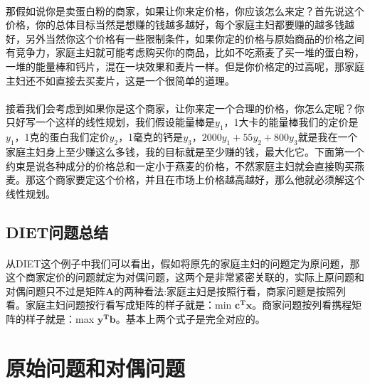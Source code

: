 		\paragraph{}那假如说你是卖蛋白粉的商家，如果让你来定价格，你应该怎么来定？首先说这个价格，你的总体目标当然是想赚的钱越多越好，每个家庭主妇都要赚的越多钱越好，另外当然你这个价格有一些限制条件，如果你定的价格与原始商品的价格之间有竞争力，家庭主妇就可能考虑购买你的商品，比如不吃燕麦了买一堆的蛋白粉，一堆的能量棒和钙片，混在一块效果和麦片一样。但是你价格定的过高呢，那家庭主妇还不如直接去买麦片，这是一个很简单的道理。
		\paragraph{}接着我们会考虑到如果你是这个商家，让你来定一个合理的价格，你怎么定呢？你只好写一个这样的线性规划，我们假设能量棒是$y_1$，1大卡的能量棒我们的定价是$y_1$，1克的蛋白我们定价$y_2$，1毫克的钙是$y_3$，$2000 y_1 + 55 y_2 + 800 y_3$就是我在一个家庭主妇身上至少赚这么多钱，我的目标就是至少赚的钱，最大化它。下面第一个约束是说各种成分的价格总和一定小于燕麦的价格，不然家庭主妇就会直接购买燕麦。那这个商家要定这个价格，并且在市场上价格越高越好，那么他就必须解这个线性规划。
		\subsection{DIET问题总结}
		\paragraph{}从DIET这个例子中我们可以看出，假如将原先的家庭主妇的问题定为原问题，那这个商家定价的问题就定为对偶问题，这两个是非常紧密关联的，实际上原问题和对偶问题只不过是矩阵$\bm{A}$的两种看法:家庭主妇是按照行看，商家问题是按照列看。家庭主妇问题按行看写成矩阵的样子就是：min $\bm{c^Tx}$。商家问题按列看携程矩阵的样子就是：max $\bm{y^Tb}$。基本上两个式子是完全对应的。
		
		\section{原始问题和对偶问题}
